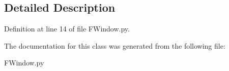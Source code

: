 \subsection{Detailed Description}


Definition at line 14 of file F\+Window.\+py.



The documentation for this class was generated from the following file\+:\begin{DoxyCompactItemize}
\item 
F\+Window.\+py\end{DoxyCompactItemize}
